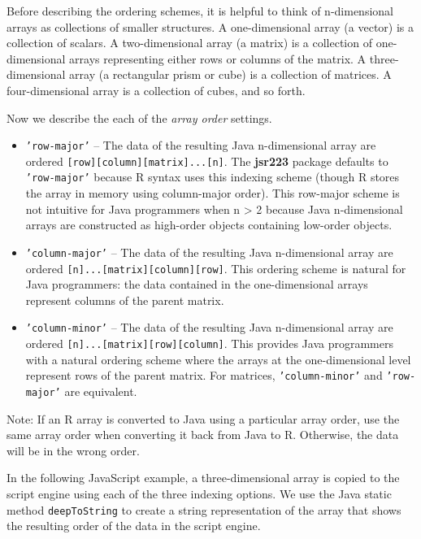 \documentclass[
article,
11pt, %
a4paper, %
oneside, %
headinclude,footinclude, %
]{scrartcl}
\theoremstyle{definition} %
\theoremstyle{plain} %
\theoremstyle{remark} %
\newcommand{\pkg}[1]{\textbf{#1}}
\newcommand{\code}[1]{\texttt{#1}}
\newcommand{\strong}[1]{\texorpdfstring{{\normalfont\fontseries{b}\selectfont #1}}{#1}}
\begin{document}
Before describing the ordering schemes, it is helpful to think of n-dimensional arrays as collections of smaller structures. A one-dimensional array (a vector) is a collection of scalars. A two-dimensional array (a matrix) is a collection of one-dimensional arrays representing either rows or columns of the matrix. A three-dimensional array (a rectangular prism or cube) is a collection of matrices. A four-dimensional array is a collection of cubes, and so forth. 

Now we describe the each of the \textit{array order} settings.

\begin{itemize}
\item \code{'row-major'} -- The data of the resulting Java n-dimensional array are ordered \newline \code{[row][column][matrix]...[n]}. The \pkg{jsr223} package defaults to \code{'row-major'} because R syntax uses this indexing scheme (though R stores the array in memory using column-major order). This row-major scheme is not intuitive for Java programmers when n > 2 because Java n-dimensional arrays are constructed as high-order objects containing low-order objects.

\item \code{'column-major'} -- The data of the resulting Java n-dimensional array are ordered \newline \code{[n]...[matrix][column][row]}. This ordering scheme is natural for Java programmers: the data contained in the one-dimensional arrays represent columns of the parent matrix.

\item \code{'column-minor'} -- The data of the resulting Java n-dimensional array are ordered \newline \code{[n]...[matrix][row][column]}. This provides Java programmers with a natural ordering scheme where the arrays at the one-dimensional level represent rows of the parent matrix. For matrices, \code{'column-minor'} and \code{'row-major'} are equivalent.

\end{itemize}

\strong{Note:} If an R array is converted to Java using a particular array order, use the same array order when converting it back from Java to R. Otherwise, the data will be in the wrong order.

In the following JavaScript example, a three-dimensional array is copied to the script engine using each of the three indexing options. We use the Java static method \code{deepToString} to create a string representation of the array that shows the resulting order of the data in the script engine.
\end{document}
